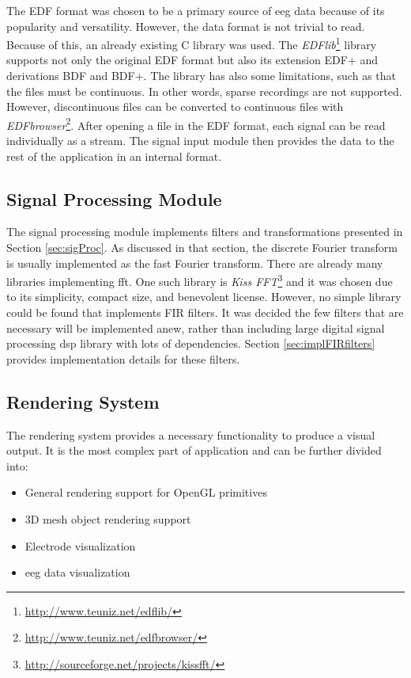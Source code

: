 The EDF format was chosen to be a primary source of \gls{eeg} data because of its popularity and versatility. However, the data format is not trivial to read. Because of this, an already existing C library was used. The \emph{EDFlib}\footnote{\url{http://www.teuniz.net/edflib/}} library supports not only the original EDF format but also its extension EDF+ and derivations BDF and BDF+. The library has also some limitations, such as that the files must be continuous. In other words, sparse recordings are not supported. However, discontinuous files can be converted to continuous files with \emph{EDFbrowser}\footnote{\url{http://www.teuniz.net/edfbrowser/}}. After opening a file in the EDF format, each signal can be read individually as a stream. The signal input module then provides the data to the rest of the application in an internal format.

\subsection{Signal Processing Module}
The signal processing module implements filters and transformations presented in Section \ref{sec:sigProc}. As discussed in that section, the discrete Fourier transform is usually implemented as the fast Fourier transform. There are already many libraries implementing \gls{fft}. One such library is \emph{Kiss FFT}\footnote{\url{http://sourceforge.net/projects/kissfft/}} and it was chosen due to its simplicity, compact size, and benevolent license. However, no simple library could be found that implements FIR filters. It was decided the few filters that are necessary will be implemented anew, rather than including large digital signal processing \gls{dsp} library with lots of dependencies. Section \ref{sec:implFIRfilters} provides implementation details for these filters.

\subsection{Rendering System}
The rendering system provides a necessary functionality to produce a visual output. It is the most complex part of application and can be further divided into:
\begin{itemize}
	\item General rendering support for OpenGL primitives
	\item 3D mesh object rendering support
	\item Electrode visualization
	\item \gls{eeg} data visualization
\end{itemize}

